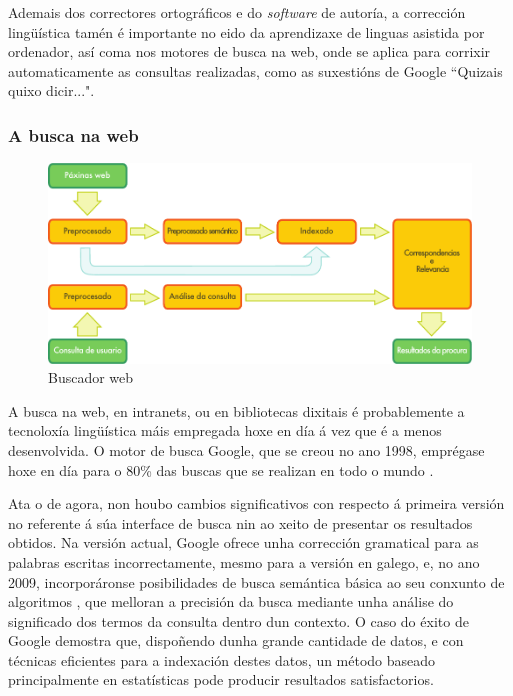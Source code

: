 \begin{multicols}{2}
Ademais dos correctores ortográficos e do \textit{software} de autoría, a corrección lingüística tamén é importante no eido da aprendizaxe de linguas asistida por ordenador, así coma nos motores de busca na web, onde se aplica para corrixir automaticamente as consultas realizadas, como as suxestións de Google “Quizais quixo dicir...". 


\subsubsection{A busca na web}

\begin{figure}[htb]
  \center
  \includegraphics[width=\textwidth]{../_media/galician/web_search_architecture}
  \caption{Buscador web}
  \label{fig:websearcharch_ga}
\end{figure}

A busca na web, en intranets, ou en bibliotecas dixitais é probablemente a tecnoloxía lingüística máis empregada hoxe en día á vez que é a menos desenvolvida. O motor de busca Google, que se creou no ano 1998, emprégase hoxe en día para o 80\% das buscas que se realizan en todo o mundo \cite{googleleavesbehind}.

Ata o de agora, non houbo cambios significativos con respecto á primeira versión no referente á súa interface de busca nin ao xeito de presentar os resultados obtidos. Na versión actual, Google ofrece unha corrección gramatical para as palabras escritas incorrectamente, mesmo para a versión en galego, e, no ano 2009, incorporáronse posibilidades de busca semántica básica ao seu conxunto de algoritmos \cite{googlesemanticsearch}, que melloran a precisión da busca mediante unha análise do significado dos termos da consulta dentro dun contexto. O caso do éxito de Google demostra que, dispoñendo dunha grande cantidade de datos, e con técnicas eficientes para a indexación destes datos, un método baseado principalmente en estatísticas pode producir resultados satisfactorios. 


\end{multicols}
